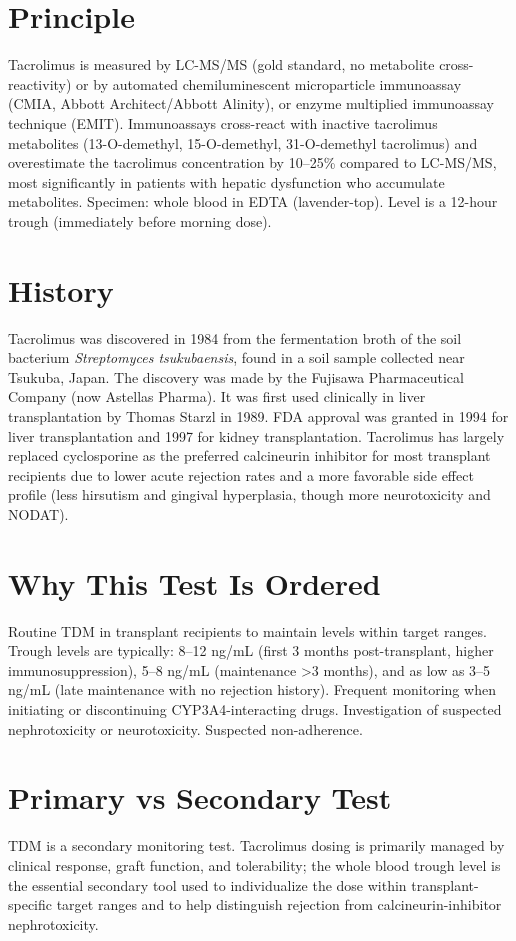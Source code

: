 \section*{Principle}
Tacrolimus is measured by LC-MS/MS (gold standard, no metabolite cross-reactivity) or by automated chemiluminescent microparticle immunoassay (CMIA, Abbott Architect/Abbott Alinity), or enzyme multiplied immunoassay technique (EMIT). Immunoassays cross-react with inactive tacrolimus metabolites (13-O-demethyl, 15-O-demethyl, 31-O-demethyl tacrolimus) and overestimate the tacrolimus concentration by 10--25\% compared to LC-MS/MS, most significantly in patients with hepatic dysfunction who accumulate metabolites. Specimen: whole blood in EDTA (lavender-top). Level is a 12-hour trough (immediately before morning dose).

\section*{History}
Tacrolimus was discovered in 1984 from the fermentation broth of the soil bacterium \textit{Streptomyces tsukubaensis}, found in a soil sample collected near Tsukuba, Japan. The discovery was made by the Fujisawa Pharmaceutical Company (now Astellas Pharma). It was first used clinically in liver transplantation by Thomas Starzl in 1989. FDA approval was granted in 1994 for liver transplantation and 1997 for kidney transplantation. Tacrolimus has largely replaced cyclosporine as the preferred calcineurin inhibitor for most transplant recipients due to lower acute rejection rates and a more favorable side effect profile (less hirsutism and gingival hyperplasia, though more neurotoxicity and NODAT).

\section*{Why This Test Is Ordered}
Routine TDM in transplant recipients to maintain levels within target ranges. Trough levels are typically: 8--12 ng/mL (first 3 months post-transplant, higher immunosuppression), 5--8 ng/mL (maintenance >3 months), and as low as 3--5 ng/mL (late maintenance with no rejection history). Frequent monitoring when initiating or discontinuing CYP3A4-interacting drugs. Investigation of suspected nephrotoxicity or neurotoxicity. Suspected non-adherence.

\section*{Primary vs Secondary Test}
TDM is a secondary monitoring test. Tacrolimus dosing is primarily managed by clinical response, graft function, and tolerability; the whole blood trough level is the essential secondary tool used to individualize the dose within transplant-specific target ranges and to help distinguish rejection from calcineurin-inhibitor nephrotoxicity.

